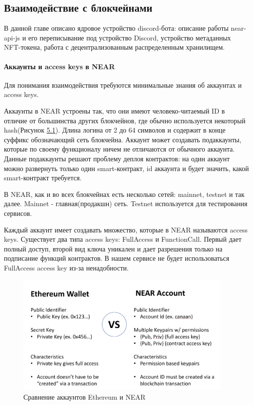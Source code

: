 \subsection{Взаимодействие с блокчейнами}

В данной главе описано ядровое устройство discord-бота: описание работы near-api-js и его переписывание под устройство Discord, устройство метаданных NFT-токена, работа с децентрализованным распределенным хранилищем.

\paragraph{Аккаунты и access keys в NEAR}
Для понимания взаимодействия требуются минимальные знания об аккаунтах и access keys.

Аккаунты в NEAR\cite{nearaccounts} устроены так, что они имеют человеко-читаемый ID в отличие от большинства других блокчейнов, где обычно используется некоторый hash(Рисунок \hyperref[fig.eth_near_cmp]{\color{blue} 5.1}). Длина логина от 2 до 64 символов и содержит в конце суффикс обозначающий сеть блокчейна. Аккаунт может создавать подаккаунты, которые по своему функционалу ничем не отличаются от обычного аккаунта. Данные подаккаунты решают проблему деплоя контрактов: на один аккаунт можно развернуть только один smart-контракт, id аккаунта и будет значить, какой smart-контракт требуется.

\begin{definition}
    В NEAR, как и во всех блокчейнах есть несколько сетей: mainnet, testnet и так далее. Mainnet - главная(продакшн) сеть. Testnet используется для тестирования сервисов.
\end{definition}

Каждый аккаунт имеет создавать множество, которые в NEAR называются access keys. Существует два типа access keys: FullAccess и FunctionCall. Первый дает полный доступ, второй вид ключа уникален и дает разрешения только на подписание функций контрактов. В нашем сервисе не будет использоваться FullAccess access key из-за ненадобности.

\begin{figure}[H]
    \centering
    \label{fig.eth_near_cmp}
    \includegraphics[height=60mm]{fig/eth_near_cmp.png}
    \caption{Сравнение аккаунтов Ethereum и NEAR}
\end{figure}

